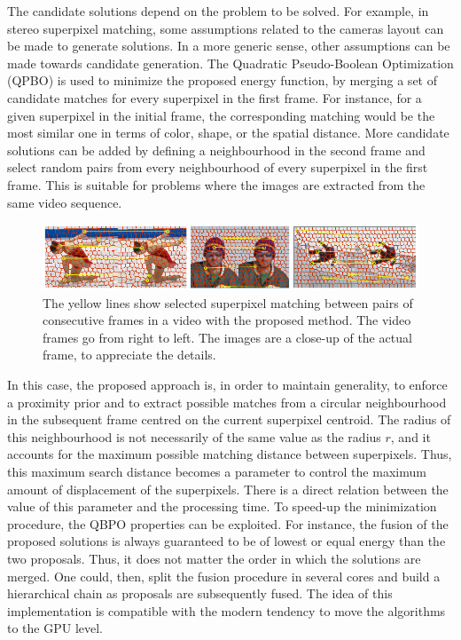 The candidate solutions depend on the problem to be solved. 
For example, in stereo superpixel matching, some assumptions related to the cameras 
layout can be made to generate solutions. In a more generic sense, other assumptions can be made towards 
candidate generation. 
The Quadratic Pseudo-Boolean Optimization (QPBO) \cite{c3}\cite{c4} is used to minimize the proposed energy function, 
by merging a set of candidate matches for every superpixel in the first frame.
For instance, for a given superpixel in the initial frame, the corresponding 
matching would be the most similar one in terms of color, shape, or the spatial distance. More candidate solutions can be added by defining a
neighbourhood in the second frame and select random pairs from every neighbourhood of every superpixel
in the first frame. This is suitable for problems where the images are extracted from the same video
sequence. 

   \begin{figure}[thpb]
      \centering
      \includegraphics[width=1.00\textwidth]{../images/matches.png}
      \caption{The yellow lines show selected superpixel
		matching between pairs of consecutive frames in a video
		with the proposed method. The video frames go from right
		to left. The images are a close-up of the actual frame, to 
		appreciate the details.}
      \label{figurelabel_matches}
   \end{figure}

In this case, the proposed approach is, in order to maintain generality, to enforce a proximity prior and to extract possible matches from 
a circular neighbourhood in the subsequent frame centred on the current superpixel centroid. The radius of this neighbourhood is not necessarily 
of the same value as the radius $r$, and it accounts for the maximum possible matching distance between superpixels. Thus, this maximum search distance becomes a parameter to control the maximum 
amount of displacement of the superpixels. There is a direct relation between the value of this 
parameter and the processing time.
To speed-up the minimization procedure, the QBPO properties can be exploited. For instance, the fusion of the
proposed solutions is always guaranteed to be of lowest or equal energy than the two proposals. Thus, it does not matter the order in which the solutions are merged. 
One could, then, split the fusion procedure in several cores and build a hierarchical chain as proposals are subsequently fused. The idea of this implementation is compatible with 
the modern tendency to move the algorithms to the GPU level.

